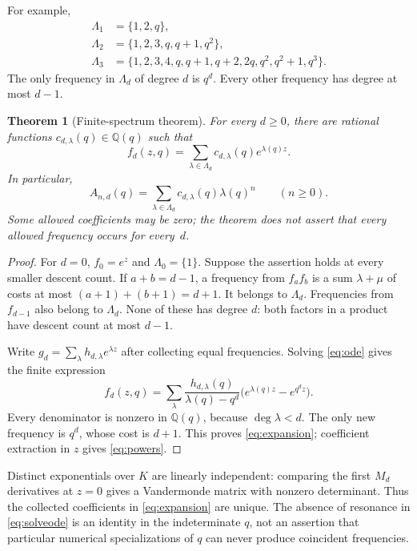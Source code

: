 \documentclass[11pt,letterpaper]{article}
\numberwithin{equation}{section}
\newtheorem{theorem}{Theorem}[section]
\theoremstyle{definition}
\theoremstyle{remark}
\newcommand{\Q}{\mathbb Q}
\newcommand{\Spec}{\Lambda}
\begin{document}
For example,
\begin{align*}
 \Spec_1&=\{1,2,q\},\\
 \Spec_2&=\{1,2,3,q,q+1,q^2\},\\
 \Spec_3&=\{1,2,3,4,q,q+1,q+2,2q,q^2,q^2+1,q^3\}.
\end{align*}
The only frequency in $\Spec_d$ of degree $d$ is $q^d$.
Every other frequency has degree at most $d-1$.

\begin{theorem}[Finite-spectrum theorem]\label{thm:spectrum}
For every $d\ge0$, there are rational functions
$c_{d,\lambda}(q)\in\Q(q)$ such that
\begin{equation}\label{eq:expansion}
 f_d(z,q)=\sum_{\lambda\in\Spec_d}c_{d,\lambda}(q)e^{\lambda(q)z}.
\end{equation}
In particular,
\begin{equation}\label{eq:powers}
 A_{n,d}(q)=\sum_{\lambda\in\Spec_d}c_{d,\lambda}(q)\lambda(q)^n
 \qquad(n\ge0).
\end{equation}
Some allowed coefficients may be zero; the theorem does not assert
that every allowed frequency occurs for every~$d$.
\end{theorem}
\begin{proof}
For $d=0$, $f_0=e^z$ and $\Spec_0=\{1\}$.
Suppose the assertion holds at every smaller descent count.
If $a+b=d-1$, a frequency from $f_af_b$ is a sum
$\lambda+\mu$ of costs at most $(a+1)+(b+1)=d+1$.
It belongs to $\Spec_d$. Frequencies from $f_{d-1}$ also belong to
$\Spec_d$. None of these has degree $d$: both factors in a product
have descent count at most $d-1$.

Write $g_d=\sum_\lambda h_{d,\lambda}e^{\lambda z}$ after collecting
equal frequencies. Solving \eqref{eq:ode} gives the finite expression
\begin{equation}\label{eq:solveode}
 f_d(z,q)=\sum_\lambda
       \frac{h_{d,\lambda}(q)}{\lambda(q)-q^d}
       \bigl(e^{\lambda(q)z}-e^{q^dz}\bigr).
\end{equation}
Every denominator is nonzero in $\Q(q)$, because $\deg\lambda<d$.
The only new frequency is $q^d$, whose cost is $d+1$.
This proves \eqref{eq:expansion}; coefficient extraction in $z$ gives
\eqref{eq:powers}.
\end{proof}

Distinct exponentials over $K$ are linearly independent: comparing the
first $M_d$ derivatives at $z=0$ gives a Vandermonde matrix with nonzero
determinant. Thus the collected coefficients in \eqref{eq:expansion}
are unique. The absence of resonance in \eqref{eq:solveode} is an identity
in the indeterminate $q$, not an assertion that particular numerical
specializations of $q$ can never produce coincident frequencies.
\end{document}
